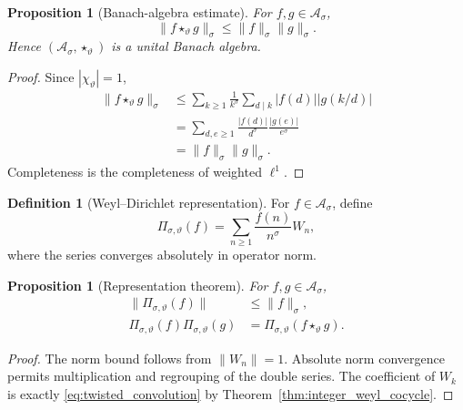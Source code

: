 \documentclass[11pt]{amsart}
\numberwithin{equation}{section}
\theoremstyle{plain}
\newtheorem{proposition}[theorem]{Proposition}
\theoremstyle{definition}
\newtheorem{definition}[theorem]{Definition}
\theoremstyle{remark}
\newcommand{\twconv}{\star_{\vartheta}}
\begin{document}
\begin{proposition}[Banach-algebra estimate]
\label{prop:banach_algebra_estimate}
For $f,g\in\mathcal A_{\sigma}$,
\begin{equation}
\|f\twconv g\|_{\sigma}
\le
\|f\|_{\sigma}\|g\|_{\sigma}.
\label{eq:banach_algebra_estimate}
\end{equation}
Hence $(\mathcal A_{\sigma},\twconv)$ is a unital Banach algebra.
\end{proposition}

\begin{proof}
Since $|\chi_{\vartheta}|=1$,
\begin{align}
\|f\twconv g\|_{\sigma}
&\le
\sum_{k\ge1}\frac{1}{k^{\sigma}}
\sum_{d\mid k}|f(d)||g(k/d)|
\label{eq:banach_estimate_step1}\\
&=
\sum_{d,e\ge1}
\frac{|f(d)|}{d^{\sigma}}
\frac{|g(e)|}{e^{\sigma}}
\label{eq:banach_estimate_step2}\\
&=
\|f\|_{\sigma}\|g\|_{\sigma}.
\label{eq:banach_estimate_step3}
\end{align}
Completeness is the completeness of weighted $\ell^1$.
\end{proof}

\begin{definition}[Weyl--Dirichlet representation]
\label{def:Weyl_Dirichlet_representation}
For $f\in\mathcal A_{\sigma}$, define
\begin{equation}
\Pi_{\sigma,\vartheta}(f)
=
\sum_{n\ge1}\frac{f(n)}{n^{\sigma}}W_n,
\label{eq:Pi_definition}
\end{equation}
where the series converges absolutely in operator norm.
\end{definition}

\begin{proposition}[Representation theorem]
\label{prop:representation_theorem}
For $f,g\in\mathcal A_{\sigma}$,
\begin{align}
\|\Pi_{\sigma,\vartheta}(f)\|
&\le\|f\|_{\sigma},
\label{eq:Pi_norm_bound}\\
\Pi_{\sigma,\vartheta}(f)
\Pi_{\sigma,\vartheta}(g)
&=
\Pi_{\sigma,\vartheta}(f\twconv g).
\label{eq:Pi_homomorphism}
\end{align}
\end{proposition}

\begin{proof}
The norm bound follows from $\|W_n\|=1$.  Absolute norm convergence permits
multiplication and regrouping of the double series.  The coefficient of
$W_k$ is exactly \eqref{eq:twisted_convolution} by
Theorem~\ref{thm:integer_weyl_cocycle}.
\end{proof}
\end{document}
